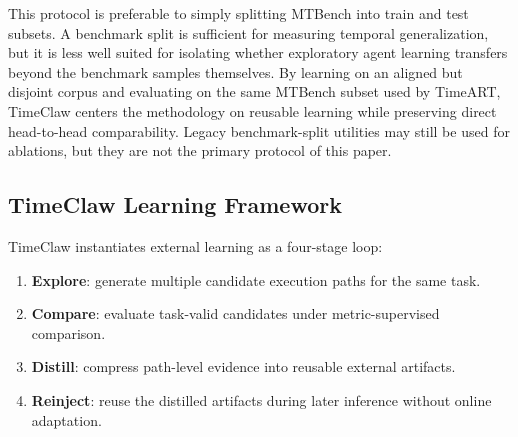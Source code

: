 This protocol is preferable to simply splitting MTBench into train and test subsets. A benchmark split is sufficient for measuring temporal generalization, but it is less well suited for isolating whether exploratory agent learning transfers beyond the benchmark samples themselves. By learning on an aligned but disjoint corpus and evaluating on the same MTBench subset used by TimeART, TimeClaw centers the methodology on reusable learning while preserving direct head-to-head comparability. Legacy benchmark-split utilities may still be used for ablations, but they are not the primary protocol of this paper.

\subsection{TimeClaw Learning Framework}
\label{sec:framework}

TimeClaw instantiates external learning as a four-stage loop:
\begin{enumerate}[leftmargin=*,itemsep=2pt]
    \item \textbf{Explore}: generate multiple candidate execution paths for the same task.
    \item \textbf{Compare}: evaluate task-valid candidates under metric-supervised comparison.
    \item \textbf{Distill}: compress path-level evidence into reusable external artifacts.
    \item \textbf{Reinject}: reuse the distilled artifacts during later inference without online adaptation.
\end{enumerate}

